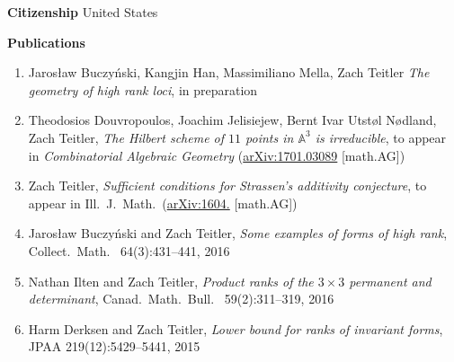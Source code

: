 \documentclass[12pt]{article}
\begin{document}

\textbf{Citizenship}
\quad United States
\bigskip






\textbf{Publications}
\begin{enumerate}[1.]

\item Jaros{\l}aw Buczy\'nski, Kangjin Han, Massimiliano Mella, Zach Teitler
\emph{The geometry of high rank loci},
in preparation

\item Theodosios Douvropoulos, Joachim Jelisiejew, Bernt Ivar Utst{\o}l N{\o}dland, Zach Teitler,
\emph{The Hilbert scheme of $11$ points in $\mathbb{A}^3$ is irreducible},
to appear in \emph{Combinatorial Algebraic Geometry}
(\href{https://arxiv.org/abs/1701.03089}{arXiv:1701.03089} [math.AG])

\item Zach Teitler,
\emph{Sufficient conditions for Strassen's additivity conjecture},
to appear in Ill.\ J.\ Math.\
(\href{https://arxiv.org/abs/1604.07691}{arXiv:1604.} [math.AG])

\item Jaros{\l}aw Buczy\'nski and Zach Teitler,
\emph{Some examples of forms of high rank},
Collect.\ Math.\
64(3):431--441, 2016

\item Nathan Ilten and Zach Teitler,
\emph{Product ranks of the $3 \times 3$ permanent and determinant},
Canad.\ Math.\ Bull.\
59(2):311--319, 2016

\item Harm Derksen and Zach Teitler,
\emph{Lower bound for ranks of invariant forms},
JPAA
219(12):5429--5441, 2015


\end{enumerate}
\end{document}
